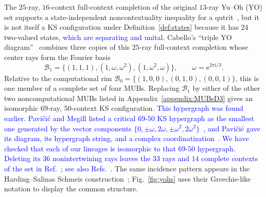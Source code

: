 \documentclass[%
  reprint,
  superscriptaddress,
  showkeys,
  amsmath,amssymb,
  aps,pra,
  longbibliography,
  floatfix,
  x11names
]{revtex4-2}
\newcommand{\ii}{\mathrm{i}}
\DeclareRobustCommand{\chg}[1]{\textcolor{blue}{#1}}
\begin{document}
The $25$-ray, $16$-context full-context completion of the original $13$-ray Yu--Oh (YO) set supports a state-independent noncontextuality inequality for a qutrit~\cite{PhysRevLett.103.050401,Yu-2012,Yu2015}, but it is not itself a KS configuration under Definition~\ref{def:states} because it has $24$ two-valued states\chg{, which are separating and unital.}  Cabello's ``triple YO diagram''~\cite{Cabello2025} combines three copies of this $25$-ray full-context completion whose center rays form the Fourier basis
\[
\mathcal{B}_1=\{(1,1,1),(1,\omega,\omega^2),(1,\omega^2,\omega)\},
\qquad \omega=\mathrm{e}^{2\pi\ii{}/3}.
\]
Relative to the computational rim $\mathcal{B}_0=\{(1,0,0),(0,1,0),(0,0,1)\}$, this is one member of a complete set of four MUBs.  Replacing $\mathcal{B}_1$ by either of the other two noncomputational MUBs listed in Appendix~\ref{appendix:MUBsD3} gives an isomorphic $69$-ray, $50$-context KS configuration.  \chg{This hypergraph was found earlier.  Pavi\v{c}i\'{c} and Megill listed a critical $69$-$50$ KS hypergraph as the smallest one generated by the vector components $\{0,\pm\omega,2\omega,\pm\omega^2,2\omega^2\}$~\cite[Table~I]{pavicic-megill-2022}, and Pavi\v{c}i\'{c} gave its diagram, its hypergraph string, and a complex coordinatization~\cite[Fig.~10(e), Table~2, and Appendix~C]{Pavicic_2023}.  We have checked that each of our lineages is isomorphic to that $69$-$50$ hypergraph.  Deleting its $36$ nonintertwining rays leaves the $33$ rays and $14$ complete contexts of the set in Ref.~\cite{Cabello2025}; see also Refs.~\cite{Pavicic-2025-simplest,Pavicic-2026-entropy}.}  The same incidence pattern appears in the Harding--Salinas Schmeis construction~\cite[Fig.~2 and Theorem~2.6]{harding2025remarksIJTP}; Fig.~\ref{fig:yohs} uses their Greechie-like notation to display the common structure.
\end{document}
